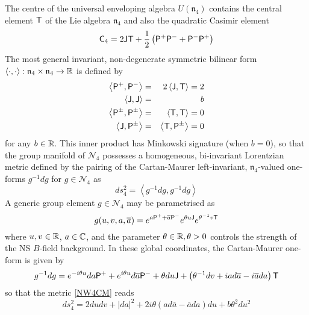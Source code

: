 The centre of the universal enveloping algebra $U(\mathfrak n_4)$ contains the
central element ${\sf T}$ of the Lie algebra $\mathfrak{n}_4$ and also the quadratic
Casimir element
\begin{equation}
  \label{NW4Casimir}
  {\sf C}_4=2 {\sf J} {\sf T}+ \frac12 \left({\sf P}^+ {\sf P}^-+{\sf P}^- {\sf P}^+\right)
\end{equation}
The most general invariant, non-degenerate symmetric bilinear form $\langle
\cdot , \cdot \rangle:\mathfrak{n}_4\times\mathfrak{n}_4\to{\mathbb R}$ is defined by
\cite{NW1}
\begin{eqnarray}
  \label{NW4innerprod}
  \left\langle{\sf P}^+ , {\sf P}^-\right\rangle&=&2 
  \left\langle{\sf J} , {\sf T}\right\rangle = 2 \nonumber\\
  \left\langle{\sf J} , {\sf J}\right\rangle&=&b \nonumber\\
  \left\langle{\sf P}^\pm , {\sf P}^\pm\right\rangle&=&
  \left\langle{\sf T} , {\sf T}\right\rangle = 0 \nonumber\\
  \left\langle{\sf J} , {\sf P}^\pm\right\rangle&=&\left\langle{\sf T} , 
    {\sf P}^\pm\right\rangle = 0
\end{eqnarray}
for any $b\in{\mathbb R}$. This inner product has Minkowski signature (when $b=0$), so
that the group manifold of $\mathcal N_4$ possesses a homogeneous, bi-invariant
Lorentzian metric defined by the pairing of the Cartan-Maurer left-invariant,
$\mathfrak n_4$-valued one-forms $g^{-1} d g$ for $g\in\mathcal N_4$ as
\begin{equation}
  \label{NW4CM}
  d s_4^2=\left\langle g^{-1}  d g , g^{-1}  d g\right\rangle
\end{equation}
A generic group element $g\in\mathcal N_4$ may be parametrised as
\begin{equation}
  \label{NW4coords}
  g(u,v,a,\overline{a} )=e^{a {\sf P}^++\overline{a} {\sf P}^-} 
  e^{\theta u {\sf J}} e^{\theta^{-1} v {\sf T}}
\end{equation}
where $u,v\in{\mathbb R}$, $a\in{\mathbb C}$, and the parameter $\theta\in{\mathbb R}, \theta > 0$ controls
the strength of the NS $B$-field background. In these global coordinates, the
Cartan-Maurer one-form is given by
\begin{equation}
  \label{NW4CMform}
  g^{-1}  d g=e^{- i \theta u}  d a {\sf P}^++e^{ i \theta u} 
  d\overline{a} {\sf P}^-+\theta  d u {\sf J}+\left(\theta^{-1}  d v+ i 
    a  d\overline{a}- i \overline{a}  d a\right) {\sf T}
\end{equation}
so that the metric \eqref{NW4CM} reads
\begin{equation}
  \label{NW4metricNW}
  d s_4^2=2  d u  d v+| d a|^2+2 i \theta \left(a 
    d\overline{a}-\overline{a}  d a\right)  d u+b \theta^2  d u^2
\end{equation}

